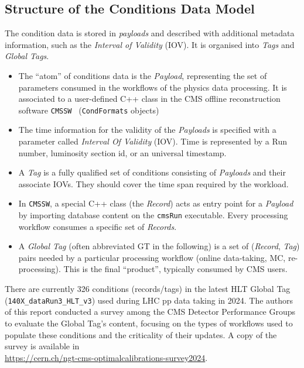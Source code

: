 \subsection{Structure of the Conditions Data Model}
The condition data is stored in \emph{payloads} and described with additional metadata information, such as the \emph{Interval of
Validity} (IOV). It is organised into \emph{Tags} and \emph{Global Tags}.
\begin{itemize}
\item The ``atom'' of conditions data is the \emph{Payload}, representing the set of parameters consumed in the workflows of the physics data processing. It is associated to a user-defined C++ class in the CMS offline reconstruction software \texttt{CMSSW}~\cite{CMSSW_ref} (\texttt{CondFormats} objects)
\item The time information for the validity of the \emph{Payloads} is specified with a parameter called \emph{Interval Of Validity} (IOV). Time is represented by a Run number, luminosity section id, or an universal timestamp.
\item A \emph{Tag} is a fully qualified set of conditions consisting of
\emph{Payloads} and their associate IOVs. They should cover the time span required by the workload.
\item In \texttt{CMSSW}, a special C++ class (the \emph{Record}) acts as entry point for a \emph{Payload} by importing database content on the \texttt{cmsRun} executable. Every processing workflow consumes a specific set of \emph{Records}.
\item A \emph{Global Tag} (often abbreviated GT in the following) is a set of (\emph{Record}, \emph{Tag}) pairs needed by a particular processing workflow (online data-taking, MC, re-processing). This is the final ``product'', typically consumed by CMS users.
\end{itemize}

There are currently 326 conditions (records/tags) in the latest HLT Global Tag (\texttt{140X\_dataRun3\_HLT\_v3}) used during LHC \Runthree pp data taking in 2024.
The authors of this report conducted a survey among the CMS Detector Performance Groups to evaluate the Global Tag's content, focusing on the types of workflows used to populate these conditions and the criticality of their updates.
A copy of the survey is available in\\
\url{https://cern.ch/ngt-cms-optimalcalibrations-survey2024}.

